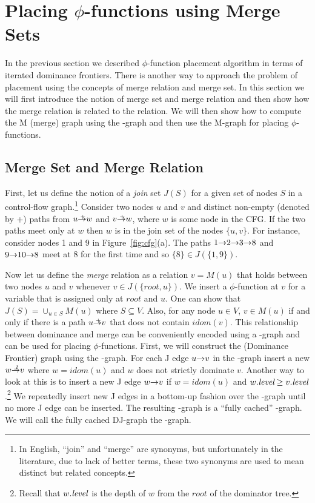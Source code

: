 {\section{Placing $\phi$-functions using Merge Sets}

In the previous section we described $\phi$-function placement algorithm in terms of iterated dominance frontiers. There is another way to approach the problem
of \phifun placement using the concepts of merge relation and merge set. In this section
we will first introduce the notion of merge set and merge relation and then show
how the merge relation is related to the \DF relation. We will then show how to compute
the M (merge) graph using the \DJ-graph and then use the M-graph for placing $\phi$-functions.

\subsection{Merge Set and Merge Relation}

First, let us define the notion of a {\em join} set $J(S)$
 for a given set of nodes  $S$ in a control-flow graph.\footnote{In English, ``join'' and ``merge'' are synonyms, 
but unfortunately
in the literature, due to lack of  better terms, these two synonyms are used to mean
distinct but related concepts.} Consider two nodes $u$ and $v$ and distinct 
non-empty (denoted by +)
paths from $u \stplus w$ and $v \stplus w$, where $w$ is some node in the CFG. If the 
two paths meet only at $w$ then $w$ is in the join set of the nodes $\{u, v\}$. 
For instance, consider nodes 1 and 9 in Figure~\ref{fig:cfg}(a).
The paths $1 \st{} 2 \st{} 3 \st{} 8$ and $9 \st{} 10 \st{} 8$ meet at $8$ 
for the first time and so $\{8\} \in J(\{1,9\})$. 

Now let us define the {\em merge} relation as a relation 
$v=M(u)$ that holds between two nodes $u$ and $v$ whenever
$v \in J(\{\textit{root}, u\})$. We insert a $\phi$-function at $v$ for a variable that is assigned
only at $\textit{root}$ and $u$. One can show that $J(S) = \cup_{u \in S} M(u)$ where $S \subseteq V$. Also, for any node $u \in V$, $v \in M(u)$ if and only if
there is a path $u \stplus v$ that does not contain $\textit{idom}(v)$.  This relationship between
dominance and merge can be conveniently encoded using a \DJ-graph and can be used for placing 
$\phi$-functions. First, we will construct the \DF (Dominance Frontier) graph using the \DJ-graph. For each J edge $u \st{} v$ in the \DJ-graph insert a new  $w \st{J} v$ where
$w = \textit{idom} (u)$ and $w$ does not strictly dominate $v$. Another way to look at 
this is to insert a new J edge $w \st{} v$ if $w = \textit{idom}(u)$ and $w.\textit{level} \geq 
v.\textit{level}$.\footnote{Recall that $w.\textit{level}$ is the depth of $w$ from the
$\textit{root}$ of the dominator tree.} We repeatedly insert new J edges in a bottom-up fashion over the \DJ-graph until no more J edge can be inserted. The resulting \DJ-graph is a ``fully cached'' \DJ-graph. We will call the fully cached DJ-graph the \DF-graph.

}
